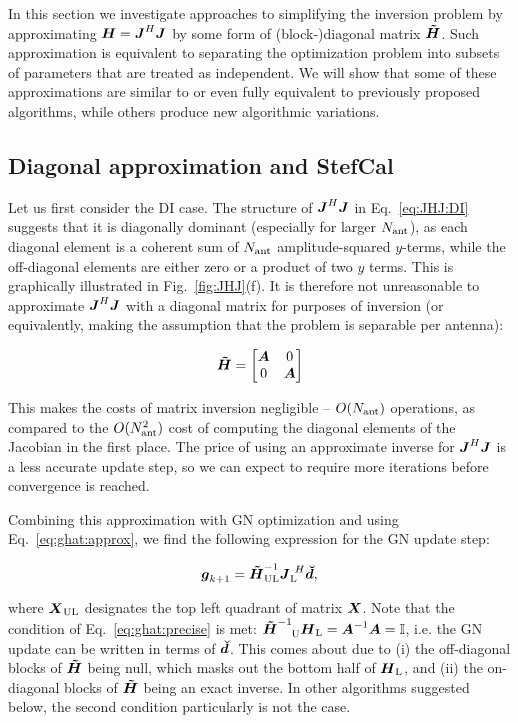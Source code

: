 \documentclass[useAMS,usenatbib]{mn2e}
\makeatletter
\newcommand{\II}{\mathbb{I}}
\newcommand{\vecg}{\bmath{g}}
\newcommand{\mat}[1]{{\bmath{#1}}}
\newcommand{\JJ}{\mat{J}} %
\newcommand{\HH}{\mat{H}} %
\newcommand{\HHa}{\mat{\tilde{H}}} %
\newcommand{\JHJ}{\JJ^H\JJ} %
\newcommand{\Matrix}[2]{\left [ \begin{array}{@{}#1@{}}#2\end{array} \right ]}
\newcommand{\AUG}[1]{\bmath{\breve{#1}}}
\newcommand{\Dd}{\AUG{d}}
\newcommand{\TOP}{\mathrm{U}}%
\newcommand{\LEFT}{\mathrm{L}}
\newcommand{\UL}{\mathrm{UL}}%
\newcommand{\StefCal}{{\sc StefCal}}
\makeatother
\begin{document}
In this section we investigate approaches to simplifying the inversion problem by approximating
$\HH=\JJ^H\JJ$ by some form of (block-)diagonal matrix $\HHa$. Such approximation is equivalent to separating
the optimization problem into subsets of parameters that are treated as independent. We will show 
that some of these approximations are similar to or even fully equivalent to previously proposed 
algorithms, while others produce new algorithmic variations.

\subsection{Diagonal approximation and \StefCal}
\label{sec:DI:stefcal}

Let us first consider the DI case. The structure of $\JJ^H\JJ$ in Eq.~\ref{eq:JHJ:DI} suggests that it is diagonally 
dominant (especially for larger $N_\mathrm{ant}$), as each diagonal element is a coherent sum of $N_\mathrm{ant}$ amplitude-squared $y$-terms, 
while the off-diagonal elements are either zero or a product of two $y$ terms. This is graphically illustrated in 
Fig.~\ref{fig:JHJ}(f). It is therefore not unreasonable 
to approximate $\JHJ$ with a diagonal matrix for purposes of inversion (or equivalently, making the assumption that 
the problem is separable per antenna):

\[
\HHa = \Matrix{cc}{\bmath{A}&0\\0&\bmath{A}}
\]

This makes the costs of matrix inversion negligible -- $O(N_\mathrm{ant})$ operations, as compared to the $O(N_\mathrm{ant}^2)$ cost 
of computing the diagonal elements of the Jacobian in the first place. The price of using an approximate inverse for 
$\JHJ$ is a less accurate update step, so we can expect to require more iterations before convergence is reached.

Combining this approximation with GN optimization and using Eq.~\ref{eq:ghat:approx}, we find the following expression
for the GN update step:

\begin{equation}
\label{eq:stefcal-matrix}
\vecg_{k+1} = \HHa^{-1}_{\UL} \JJ_\LEFT^{~H} \Dd,
\end{equation}

where $\bmath{X}_\UL$ designates the top left quadrant of matrix $\bmath{X}$. Note that the condition of 
Eq.~\ref{eq:ghat:precise} is met: $\HHa^{-1}_{~~~\TOP} \HH_\LEFT=\bmath{A}^{-1}\bmath{A}=\II$, i.e. the
GN update can be written in terms of $\Dd$. This comes about due to
(i) the off-diagonal blocks of $\HHa$ being null, which masks out the bottom half of $\HH_\LEFT$, and 
(ii) the on-diagonal blocks of $\HHa$ being an exact inverse. In other algorithms suggested below, the second
condition particularly is not the case.
\end{document}

